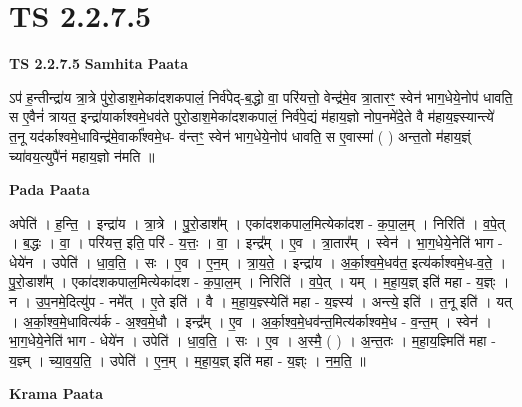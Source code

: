 \documentclass[17pt]{extarticle}
\begin{document}
\section*{ TS 2.2.7.5 }

\textbf{TS 2.2.7.5 } \newline
\textbf{Samhita Paata} \newline

ऽप॑ ह॒न्तीन्द्रा॑य त्रा॒त्रे पु॑रो॒डाश॒मेका॑दशकपालं॒ निर्व॑पेद्-ब॒द्धो वा॒ परि॑यत्तो॒ वेन्द्र॑मे॒व त्रा॒तारꣳ॒॒ स्वेन॑ भाग॒धेये॒नोप॑ धावति॒ स ए॒वैनं॑ त्रायत॒ इन्द्रा॑यार्काश्वमे॒धव॑ते पुरो॒डाश॒मेका॑दशकपालं॒ निर्व॑पे॒द्यं म॑हाय॒ज्ञो नोप॒नमे॑दे॒ते वै म॑हाय॒ज्ञ्स्यान्त्ये॑ त॒नू यद॑र्काश्वमे॒धाविन्द्र॑मे॒वार्का᳚श्वमे॒ध- व॑न्तꣳ॒॒ स्वेन॑ भाग॒धेये॒नोप॑ धावति॒ स ए॒वास्मा॑ ( ) अन्त॒तो म॑हाय॒ज्ञ्ं च्या॑वय॒त्युपै॑नं महाय॒ज्ञो न॑मति ॥ \newline

\textbf{Pada Paata} \newline

अपेति॑ । ह॒न्ति॒ । इन्द्रा॑य । त्रा॒त्रे । पु॒रो॒डाश᳚म् । एका॑दशकपाल॒मित्येका॑दश - क॒पा॒ल॒म् । निरिति॑ । व॒पे॒त् । ब॒द्धः । वा॒ । परि॑यत्त॒ इति॒ परि॑ - य॒त्तः॒ । वा॒ । इन्द्र᳚म् । ए॒व । त्रा॒तार᳚म् । स्वेन॑ । भा॒ग॒धेये॒नेति॑ भाग - धेये॑न । उपेति॑ । धा॒व॒ति॒ । सः । ए॒व । ए॒न॒म् । त्रा॒य॒ते॒ । इन्द्रा॑य । अ॒र्का॒श्व॒मे॒धव॑त॒ इत्य॑र्काश्वमे॒ध-व॒ते॒ । पु॒रो॒डाश᳚म् । एका॑दशकपाल॒मित्येका॑दश - क॒पा॒ल॒म् । निरिति॑ । व॒पे॒त् । यम् । म॒हा॒य॒ज्ञ् इति॑ महा - य॒ज्ञ्ः । न । उ॒प॒नमे॒दित्यु॑प - नमे᳚त् । ए॒ते इति॑ । वै । म॒हा॒य॒ज्ञ्स्येति॑ महा - य॒ज्ञ्स्य॑ । अन्त्ये॒ इति॑ । त॒नू इति॑ । यत् । अ॒र्का॒श्व॒मे॒धावित्य॑र्क - अ॒श्व॒मे॒धौ । इन्द्र᳚म् । ए॒व । अ॒र्का॒श्व॒मे॒धव॑न्त॒मित्य॑र्काश्वमे॒ध - व॒न्त॒म् । स्वेन॑ । भा॒ग॒धेये॒नेति॑ भाग - धेये॑न । उपेति॑ । धा॒व॒ति॒ । सः । ए॒व । अ॒स्मै॒ ( ) । अ॒न्त॒तः । म॒हा॒य॒ज्ञ्मिति॑ महा - य॒ज्ञ्म् । च्या॒व॒य॒ति॒ । उपेति॑ । ए॒न॒म् । म॒हा॒य॒ज्ञ् इति॑ महा - य॒ज्ञ्ः । न॒म॒ति॒ ॥  \newline


\textbf{Krama Paata} \newline
\end{document}
